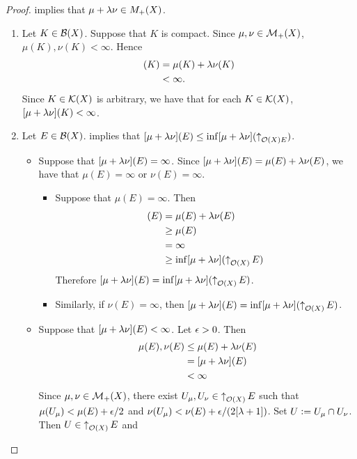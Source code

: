 \documentclass{book}
\begin{document}
	\begin{proof}
		\rex{}  implies that $\mu + \lambda \nu \in M_+(X)$. 
		\begin{enumerate}
			\item Let $K \in \mathcal{B}(X)$. Suppose that $K$ is compact. Since $\mu, \nu \in \mathcal{M}_+(X)$, $\mu(K), \nu(K) < \infty$. Hence 
			\begin{align*}
				[\mu + \lam \nu](K) 
				& = \mu(K) + \lam \nu(K) \\
				& < \infty.
			\end{align*} 
			Since $K \in \mathcal{K}(X)$ is arbitrary, we have that for each $K \in \mathcal{K}(X)$, $[\mu + \lambda \nu](K) < \infty$.
			\item Let $E \in \mathcal{B}(X)$.  implies that $[\mu + \lambda \nu](E) \leq \inf [\mu + \lambda \nu](\operatorname{\uparrow}_{\mathcal{O}(X) E})$.
			\begin{itemize}
				\item Suppose that $[\mu + \lambda \nu](E) = \infty$. Since $[\mu + \lambda \nu](E) = \mu(E) + \lambda \nu(E)$, we have that $\mu(E) = \infty$ or $\nu(E) = \infty$. 
				\begin{itemize}
					\item Suppose that $\mu(E) = \infty$. Then
					\begin{align*}
						[\mu + \lam \nu](E)
						& = \mu(E) + \lam \nu(E) \\
						& \geq \mu(E) \\
						& = \infty \\
						& \geq \inf [\mu + \lam \nu](\upar_{\MO(X)} E)
					\end{align*}
					Therefore $[\mu + \lambda \nu](E) = \inf [\mu + \lambda \nu](\operatorname{\uparrow}_{\mathcal{O}(X)} E)$.
					\item Similarly, if $\nu(E) = \infty$, then $[\mu + \lambda \nu](E) = \inf [\mu + \lambda \nu](\operatorname{\uparrow}_{\mathcal{O}(X)} E)$.
				\end{itemize}
				\item Suppose that $[\mu + \lambda \nu](E) < \infty$. Let $\epsilon > 0$. Then 
				\begin{align*}
					\mu(E) , \nu(E)
					& \leq \mu(E) + \lambda \nu(E) \\
					& = [\mu + \lambda \nu](E) \\
					& < \infty
				\end{align*}
				Since $\mu, \nu \in \mathcal{M}_+(X)$, there exist $U_{\mu}, U_{\nu} \in \operatorname{\uparrow}_{\mathcal{O}(X)} E$ such that $\mu(U_{\mu}) < \mu(E) + \epsilon/2$ and $\nu(U_{\mu}) < \nu(E) + \epsilon/(2 [\lambda + 1])$. Set $U \vcentcolon= U_{\mu} \cap U_{\nu}$. Then $U \in \operatorname{\uparrow}_{\mathcal{O}(X)} E$ and

\end{itemize}
\end{enumerate}
\end{proof}
\end{document}
